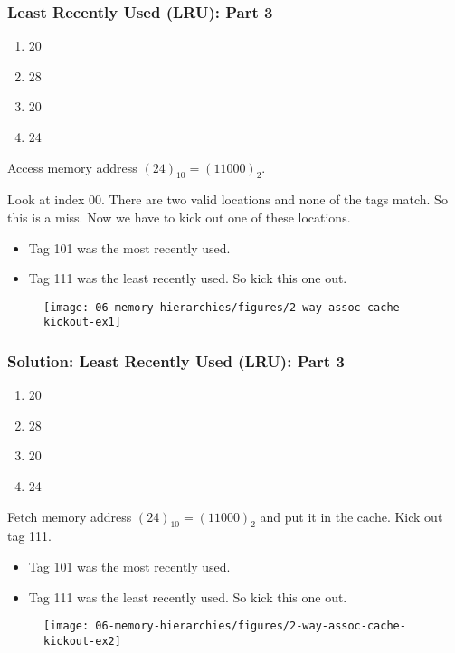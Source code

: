 {%
\newpage
\begin{frame}\frametitle{Least Recently Used (LRU): Part 3}
\begin{enumerate}
\item {\color{gray}20}
\item {\color{gray}28}
\item {\color{gray}20}
\item 24
\end{enumerate}
Access memory address $(24)_{10}=(11000)_2$.
{\footnotesize Look at index 00. There are two valid locations and none of the tags match. So this is a miss. Now we have to kick out one of these locations.
\begin{itemize}
\item Tag 101 was the most recently used.
\item Tag 111 was the least recently used. So kick this one out.
\end{itemize}
}
\begin{figure}[H]
\centering
{\texttt{[image: 06-memory-hierarchies/figures/2-way-assoc-cache-kickout-ex1]}}
\end{figure}

\end{frame}

\begin{frame}\frametitle{Solution: Least Recently Used (LRU): Part 3}
\begin{enumerate}
\item {\color{gray}20}
\item {\color{gray}28}
\item {\color{gray}20}
\item {\color{gray}24}
\end{enumerate}
Fetch memory address $(24)_{10}=(11000)_2$ and put it in the cache. Kick out tag 111.
\begin{itemize}
\item Tag 101 was the most recently used.
\item Tag 111 was the least recently used. So kick this one out.
\end{itemize}
\begin{figure}[H]
\centering
{\texttt{[image: 06-memory-hierarchies/figures/2-way-assoc-cache-kickout-ex2]}}
\end{figure}

\end{frame}
}\fi

